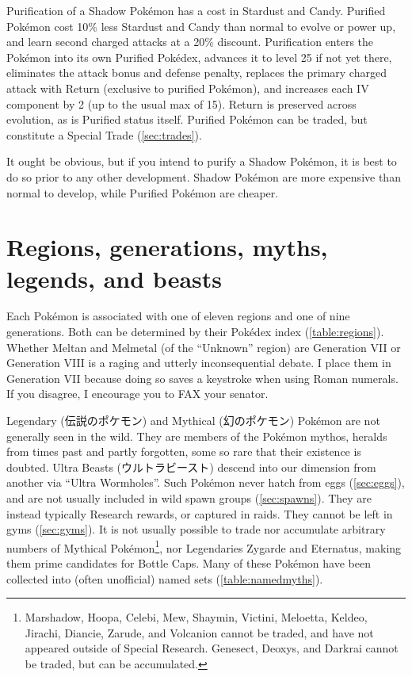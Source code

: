Purification of a Shadow Pokémon has a cost in Stardust and Candy.
Purified Pokémon cost 10\% less Stardust and Candy than normal to evolve or power up,
 and learn second charged attacks at a 20\% discount.
Purification enters the Pokémon into its own Purified Pokédex,
 advances it to level 25 if not yet there,
 eliminates the attack bonus and defense penalty,
 replaces the primary charged attack with Return (exclusive to purified Pokémon),
 and increases each IV component by 2  (up to the usual max of 15).
Return is preserved across evolution, as is Purified status itself.
Purified Pokémon can be traded, but constitute a Special Trade (\autoref{sec:trades}).

It ought be obvious, but if you intend to purify a Shadow Pokémon, it
  is best to do so prior to any other development.
Shadow Pokémon are more expensive than normal to develop, while Purified Pokémon are cheaper.

\section{Regions, generations, myths, legends, and beasts\label{sec:regions}}
Each Pokémon is associated with one of eleven regions and one of nine generations.
Both can be determined by their Pokédex index (\autoref{table:regions}).
Whether Meltan and Melmetal (of the ``Unknown'' region) are Generation VII
  or Generation VIII is a raging and utterly inconsequential debate.
I place them in Generation VII because doing so saves a keystroke when using Roman numerals.
If you disagree, I encourage you to FAX your senator.

Legendary (\textjapanese{伝説のポケモン}) and Mythical (\textjapanese{幻のポケモン}) Pokémon
 are not generally seen in the wild.
They are members of the Pokémon mythos, heralds from times past and partly forgotten,
  some so rare that their existence is doubted.
Ultra Beasts (\textjapanese{ウルトラビースト}) descend into our dimension from
  another via ``Ultra Wormholes''.
Such Pokémon never hatch from eggs (\autoref{sec:eggs}), and are not usually included in wild spawn groups (\autoref{sec:spawns}).
They are instead typically Research rewards, or captured in raids.
They cannot be left in gyms (\autoref{sec:gyms}).
It is not usually possible to trade nor accumulate arbitrary numbers of Mythical
  Pokémon\footnote{Marshadow, Hoopa, Celebi, Mew, Shaymin, Victini, Meloetta, Keldeo,
  Jirachi, Diancie, Zarude, and Volcanion cannot be traded, and have not appeared outside of Special Research.
  Genesect, Deoxys, and Darkrai cannot be traded, but can be accumulated.}, nor Legendaries Zygarde and
  Eternatus, making them prime candidates for Bottle Caps.
Many of these Pokémon have been collected into (often unofficial) named sets (\autoref{table:namedmyths}).

